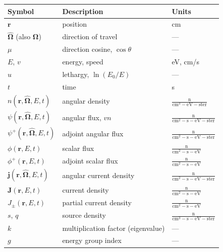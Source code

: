 \begin{center}
 {\small
 \begin{tabular*}{0.95\textwidth}{@{\extracolsep{\fill}} lll }
  \toprule
   Symbol                                        & Description                   & Units  \\
  \midrule
   $\mathbf{r}$                                  & position                      & cm \\
   $\hat{\bm{\Omega}}$ (also $\mathbf{\Omega}$)  & direction of travel           & --- \\
   $\mu$                                         & direction cosine, $\cos\theta$ & --- \\
   $E$, $v$                                      & energy, speed                 & eV, cm/s \\
   $u$                                           & lethargy, $\ln(E_0/E)$        & --- \\
   $t$                                           & time                          & s \\
   $n(\mathbf{r},\hat{\bm{\Omega}},E,t)$         & angular density               & $\frac{\mathrm{n}}{\mathrm{cm^3-eV-ster}}$ \\
   $\psi(\mathbf{r},\hat{\bm{\Omega}},E,t)$      & angular flux, $v n$           & $\frac{\mathrm{n}}{\mathrm{cm^2-s-eV-ster}}$  \\
   $\psi^+(\mathbf{r},\hat{\bm{\Omega}},E,t)$    & adjoint angular flux          & $\frac{\mathrm{n}}{\mathrm{cm^2-s-eV-ster}}$  \\
   $\phi(\mathbf{r},E,t)$                        & scalar flux                   & $\frac{\mathrm{n}}{\mathrm{cm^2-s-eV}}$  \\
   $\phi^+(\mathbf{r},E,t)$                      & adjoint scalar flux           & $\frac{\mathrm{n}}{\mathrm{cm^2-s-eV}}$  \\
   $\mathbf{j}(\mathbf{r},\hat{\bm{\Omega}},E,t)$ & angular current density      & $\frac{\mathrm{n}}{\mathrm{cm^2-s-eV-ster}}$  \\
   $\mathbf{J}(\mathbf{r},E,t)$                  & current density               & $\frac{\mathrm{n}}{\mathrm{cm^2-s-eV}}$  \\
   $J_{\pm}(\mathbf{r},E,t)$                     & partial current density       & $\frac{\mathrm{n}}{\mathrm{cm^2-s-eV}}$  \\
   $s$, $q$                                      & source density                & $\frac{\mathrm{n}}{\mathrm{cm^3-s-eV-ster}}$ \\
   $k$                                           & multiplication factor (eigenvalue) & --- \\
   $g$                                           & energy group index            & --- \\
  \bottomrule
 \end{tabular*}
 }
\end{center}

